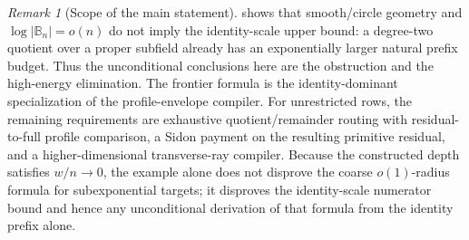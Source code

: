 \documentclass[11pt,a4paper]{amsart}
\numberwithin{equation}{section}
\theoremstyle{remark}
\newtheorem{remark}[theorem]{Remark}
\newcommand{\B}{\mathbb B}
\begin{document}
\begin{remark}[Scope of the main statement]
 shows that smooth/circle geometry and
\(\log|\B_n|=o(n)\) do not imply the identity-scale upper bound: a
degree-two quotient over a proper subfield already has an exponentially
larger natural prefix budget.  Thus the unconditional conclusions here are
the obstruction and the high-energy elimination.  The frontier formula is
the identity-dominant specialization of the profile-envelope compiler.  For
unrestricted rows, the remaining requirements are exhaustive
quotient/remainder routing with residual-to-full profile comparison, a
Sidon payment on the resulting primitive residual, and a
higher-dimensional transverse-ray compiler.
Because the constructed depth satisfies \(w/n\to0\), the example alone
does not disprove the coarse \(o(1)\)-radius formula for subexponential
targets; it disproves the identity-scale numerator bound and hence any
unconditional derivation of that formula from the identity prefix alone.
\end{remark}
\end{document}
